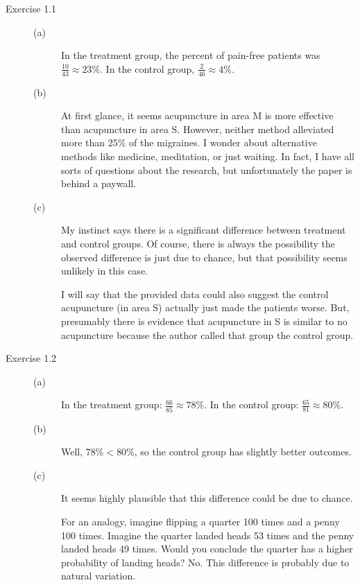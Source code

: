 \documentclass[12pt,letterpaper]{article}
\begin{document}
\begin{description}
\item[Exercise 1.1]
\begin{description}
\item[(a)] In the treatment group, the percent of pain-free patients was $\frac{10}{43}\approx 23\%$. In the control group, $\frac{2}{46} \approx 4\%$.
\item[(b)] At first glance, it seems acupuncture in area M is more effective than acupuncture in area S. However, neither method alleviated more than 25\% of the migraines. I wonder about alternative methods like medicine, meditation, or just waiting. In fact, I have all sorts of questions about the research, but unfortunately the paper is behind a paywall.
\item[(c)] My instinct says there is a significant difference between treatment and control groups. Of course, there is always the possibility the observed difference is just due to chance, but that possibility seems unlikely in this case.

I will say that the provided data could also suggest the control acupuncture (in area S) actually just made the patients worse. But, presumably there is evidence that acupuncture in S is similar to no acupuncture because the author called that group the control group.
\end{description}

\item[Exercise 1.2]
\begin{description}
\item[(a)] In the treatment group: $\frac{66}{85}\approx 78\%$. In the control group: $\frac{65}{81} \approx 80\%$.
\item[(b)] Well, $78\% < 80\%$, so the control group has slightly better outcomes.
\item[(c)] It seems highly plausible that this difference could be due to chance. 

For an analogy, imagine flipping a quarter 100 times and a penny 100 times. Imagine the quarter landed heads 53 times and the penny landed heads 49 times. Would you conclude the quarter has a higher probability of landing heads? No. This difference is probably due to natural variation.
\end{description}
\end{description}
\end{document}

